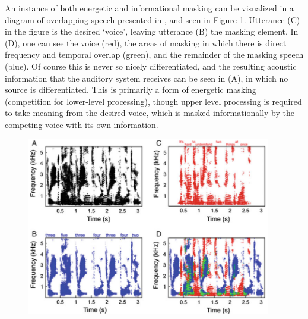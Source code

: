 An instance of both energetic and informational masking can be visualized in a diagram of overlapping speech presented in \cite{middlebrooks:17}, and seen in Figure \ref{fig:sos-masked-spctgrms}. %
\DIFdelbegin %
{%
}
\DIFdelend Utterance (C) in the figure is the desired `voice', leaving utterance (B) the masking element.  In (D), one can see the voice (red), the areas of masking in which there is direct frequency and temporal overlap (green), and the remainder of the masking speech (blue). Of course this is never so nicely differentiated, and the resulting acoustic information that the auditory system receives can be seen in (A), in which no source is differentiated.  This is primarily a form of energetic masking (competition for lower-level processing), though upper level processing is required to take meaning from the desired voice, which is masked informationally by the competing voice with its own information.
\DIFaddbegin \begin{figure}[h!]
\centering
  \includegraphics[width=0.95\textwidth]{figure/speech-on-speech_masked_spectrograms.png}
  \caption{}
  \label{fig:sos-masked-spctgrms}
\end{figure}
